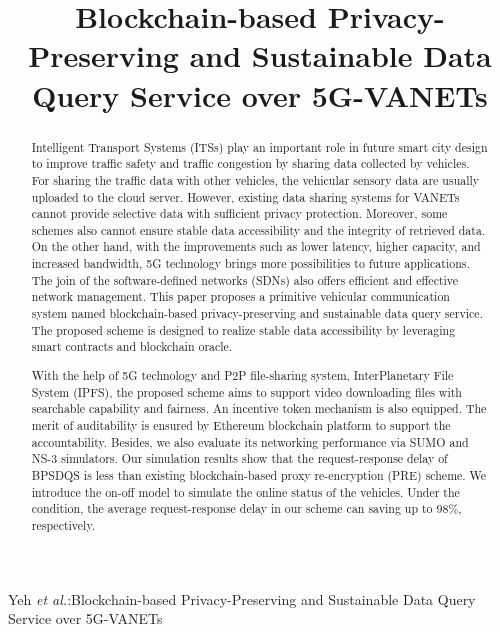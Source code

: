 \documentclass[journal]{IEEEtran}
\begin{document}
	
	\title{Blockchain-based Privacy-Preserving and Sustainable Data Query Service over 5G-VANETs}
	
	\author{}
	
    {Yeh \MakeLowercase{\textit{et al.}}:Blockchain-based Privacy-Preserving and Sustainable Data Query Service over 5G-VANETs}
	
	\maketitle
	
	\begin{abstract}
	    Intelligent Transport Systems (ITSs) play an important role in future smart city design to improve traffic safety and traffic congestion by sharing data collected by vehicles. For sharing the traffic data with other vehicles, the vehicular sensory data are usually uploaded to the cloud server. However, existing data sharing systems for VANETs cannot provide selective data with sufficient privacy protection. Moreover, some schemes also cannot ensure stable data accessibility and the integrity of retrieved data. On the other hand, with the improvements such as lower latency, higher capacity, and increased bandwidth, 5G technology brings more possibilities to future applications. The join of the software-defined networks (SDNs) also offers efficient and effective network management. This paper proposes a primitive vehicular communication system named blockchain-based privacy-preserving and sustainable data query service. The proposed scheme is designed to realize stable data accessibility by leveraging smart contracts and blockchain oracle.

        With the help of 5G technology and P2P file-sharing system, InterPlanetary File System (IPFS), the proposed scheme aims to support video downloading files with searchable capability and fairness. An incentive token mechanism is also equipped. The merit of auditability is ensured by Ethereum blockchain platform to support the accountability. Besides, we also evaluate its networking performance via SUMO and NS-3 simulators. Our simulation results show that the request-response delay of BPSDQS is less than existing blockchain-based proxy re-encryption (PRE) scheme. We introduce the on-off model to simulate the online status of the vehicles. Under the condition, the average request-response delay in our scheme can saving up to $98\%$, respectively. 
	\end{abstract}
	
\end{document}
